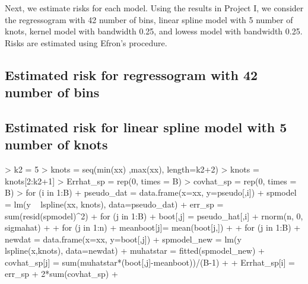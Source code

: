 \documentclass[12pt]{article}
\begin{document}
Next, we estimate risks for each model. Using the results in Project I, we consider the regressogram with 42 number of bins, linear spline model with 5 number of knots, kernel model with bandwidth 0.25, and lowess model with bandwidth 0.25. Risks are estimated using Efron's procedure.

\subsection{Estimated risk for regressogram with 42 number of bins}
\begin{Schunk}
\end{Schunk}

\subsection{Estimated risk for linear spline model with 5 number of knots}
\begin{Schunk}
\begin{Sinput}
> k2 = 5
> knots = seq(min(xx) ,max(xx), length=k2+2)
> knots = knots[2:k2+1]
> Errhat_sp = rep(0, times = B)
> covhat_sp = rep(0, times = B)
> for (i in 1:B){
+   pseudo_dat = data.frame(x=xx, y=pseudo[,i])
+   spmodel = lm(y ~ lspline(xx, knots), data=pseudo_dat)
+   err_sp = sum(resid(spmodel)^2)
+   for (j in 1:B){
+     boot[,j] = pseudo_hat[,i] + rnorm(n, 0, sigmahat)
+   }
+   for (j in 1:n){
+     meanboot[j]= mean(boot[j,])
+   }
+   for (j in 1:B){
+     newdat = data.frame(x=xx, y=boot[,j])
+     spmodel_new = lm(y ~ lspline(x,knots), data=newdat)
+     muhatstar = fitted(spmodel_new)
+     covhat_sp[j] = sum(muhatstar*(boot[,j]-meanboot))/(B-1)
+   }
+   Errhat_sp[i] = err_sp + 2*sum(covhat_sp)
+ }
\end{Sinput}
\end{Schunk}
\end{document}
